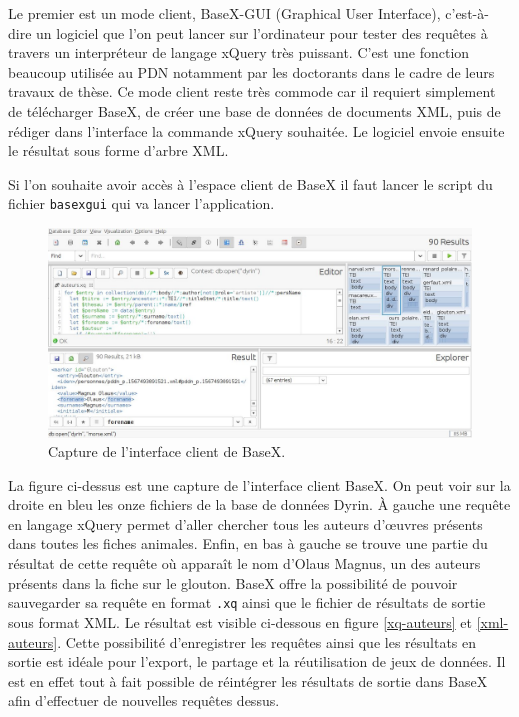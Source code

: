 \documentclass[a4paper,12pt,twoside]{book}
\begin{document}
    Le premier est un mode client, BaseX-GUI (Graphical User Interface), c'est-à-dire un logiciel que l'on peut lancer sur l'ordinateur pour tester des requêtes à travers un interpréteur de langage xQuery très puissant. C'est une fonction beaucoup utilisée au \acrshort{PDN} notamment par les doctorants dans le cadre de leurs travaux de thèse. Ce mode client reste très commode car il requiert simplement de télécharger BaseX, de créer une base de données de documents XML, puis de rédiger dans l'interface la commande xQuery souhaitée. Le logiciel envoie ensuite le résultat sous forme d'arbre XML.
    
  
    Si l'on souhaite avoir accès à l'espace client de BaseX il faut lancer le script du fichier \texttt{basexgui} qui va lancer l'application.
    
    \begin{figure}[H]
    \centering
    \includegraphics[width=14cm]{img/partie_1/basex_interface_client.JPG}
    \caption{Capture de l'interface client de BaseX.}
\end{figure}
    
    La figure ci-dessus est une capture de l'interface client BaseX. On peut voir sur la droite en bleu les onze fichiers de la base de données Dyrin. À gauche une requête en langage xQuery permet d'aller chercher tous les auteurs d'\oe{}uvres présents dans toutes les fiches animales. Enfin, en bas à gauche se trouve une partie du résultat de cette requête où apparaît le nom d'Olaus Magnus, un des auteurs présents dans la fiche sur le glouton. BaseX offre la possibilité de pouvoir sauvegarder sa requête en format \texttt{.xq} ainsi que le fichier de résultats de sortie sous format XML. Le résultat est visible ci-dessous en figure \ref{xq-auteurs} et \ref{xml-auteurs}.
    Cette possibilité  d'enregistrer les requêtes ainsi que les résultats en sortie est idéale pour l'export, le partage et la réutilisation de jeux de données. Il est en effet tout à fait possible de réintégrer les résultats de sortie dans BaseX afin d'effectuer de nouvelles requêtes dessus.
    
\end{document}
